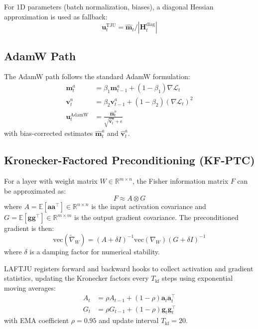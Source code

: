 \documentclass[10pt,twocolumn]{article}
\newcommand{\method}{LAFTJU}
\newcommand{\R}{\mathbb{R}}
\newcommand{\E}{\mathbb{E}}
\begin{document}
For 1D parameters (batch normalization, biases), a diagonal Hessian approximation is used as fallback:
\begin{equation}
\mathbf{u}_t^{\text{TJU}} = \hat{\mathbf{m}}_t / |\mathbf{H}_t^{\text{diag}}|
\end{equation}

\subsection{AdamW Path}

The AdamW path follows the standard AdamW formulation:
\begin{align}
\mathbf{m}_t^a &= \beta_1 \mathbf{m}_{t-1}^a + (1-\beta_1) \nabla \mathcal{L}_t \\
\mathbf{v}_t^a &= \beta_2 \mathbf{v}_{t-1}^a + (1-\beta_2) (\nabla \mathcal{L}_t)^2 \\
\mathbf{u}_t^{\text{AdamW}} &= \frac{\hat{\mathbf{m}}_t^a}{\sqrt{\hat{\mathbf{v}}_t^a} + \epsilon}
\end{align}
with bias-corrected estimates $\hat{\mathbf{m}}_t^a$ and $\hat{\mathbf{v}}_t^a$.

\subsection{Kronecker-Factored Preconditioning (KF-PTC)}
\label{sec:kfptc}

For a layer with weight matrix $W \in \R^{m \times n}$, the Fisher information matrix $F$ can be approximated as:
\begin{equation}
F \approx A \otimes G
\end{equation}
where $A = \E[\mathbf{a}\mathbf{a}^\top] \in \R^{n \times n}$ is the input activation covariance and $G = \E[\mathbf{g}\mathbf{g}^\top] \in \R^{m \times m}$ is the output gradient covariance. The preconditioned gradient is then:
\begin{equation}
\text{vec}(\tilde{\nabla}_W) = (A + \delta I)^{-1} \text{vec}(\nabla_W) (G + \delta I)^{-1}
\end{equation}
where $\delta$ is a damping factor for numerical stability.

\method{} registers forward and backward hooks to collect activation and gradient statistics, updating the Kronecker factors every $T_{\text{kf}}$ steps using exponential moving averages:
\begin{align}
A_t &= \rho A_{t-1} + (1-\rho) \mathbf{a}_t \mathbf{a}_t^\top \\
G_t &= \rho G_{t-1} + (1-\rho) \mathbf{g}_t \mathbf{g}_t^\top
\end{align}
with EMA coefficient $\rho = 0.95$ and update interval $T_{\text{kf}} = 20$.
\end{document}
